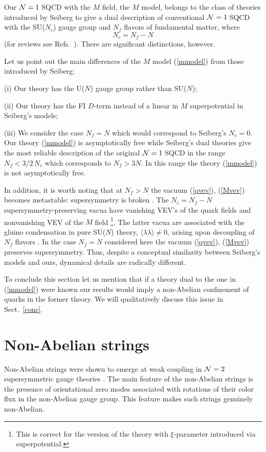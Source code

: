\documentclass[epsfig,12pt]{article}
\newcommand{\ntwo}{${\cal N}=2\;$}
\newcommand{\none}{${\cal N}=1\;$}
\begin{document}
Our \none SQCD with the $M$ field, the $M$ model, belongs to the class of theories
introduced by Seiberg \cite{Sdual} to give a dual description of conventional \none SQCD
with the SU($N_c$) gauge group and $N_f$ flavors of fundamental matter, where
$$N_c=N_f - N$$  (for reviews  see Refs.~\cite{IS,MS}). There are significant distinctions, however.

Let us point out the main 
differences of the $M$ model (\ref{mmodel}) from those introduced \cite{Sdual}
by Seiberg:

(i) Our theory has the U($N$) gauge group rather than SU($N$);

(ii) Our theory has the FI $D$-term instead of a linear in $M$ superpotential
  in Seiberg's models;
  
(iii) We consider the case $N_f=N$ which would correspond to 
Seiberg's $N_c=0$. Our theory
(\ref{mmodel}) is asymptotically free while Seiberg's dual theories 
give the most reliable description of the original \none SQCD in the range
$N_f<3/2\,N_c$ which corresponds to $N_f>3N$. In this range the theory 
(\ref{mmodel}) is not asymptotically free.

In addition, it is worth noting that at $N_f>N$ the vacuum (\ref{qvev}), (\ref{Mvev})
becomes metastable: supersymmetry is broken \cite{ISS}. The $N_c=N_f - N$
supersymmetry-preserving vacua have vanishing VEV's of the quark fields and 
nonvanishing VEV of the $M$ field
\footnote{This is correct for the version of the theory with 
$\xi$-parameter introduced via superpotential.}. The latter vacua are associated with 
the gluino 
condensation in pure SU($N$) theory,
$\langle\lambda\lambda\rangle \neq 0$, arising  upon decoupling of $N_f$ flavors
\cite{IS}. In the case $N_f=N$ considered here the vacuum (\ref{qvev}), 
(\ref{Mvev}) preserves supersymmetry. Thus, despite
a conceptual similarity between Seiberg's models and ours,
dynamical details are radically different. 

To conclude this section let us mention that if a  theory dual to  the one
in (\ref{mmodel}) were known our results would imply a non-Abelian confinement
of quarks in the former theory. We will qualitatively discuss  this issue  
in Sect.~\ref{conc}.

\section{Non-Abelian strings}
\label{strings}
\setcounter{equation}{0}

Non-Abelian strings were shown to emerge at weak coupling
in \ntwo  supersymmetric gauge theories \cite{HT1,ABEKY,SYmon,HT2}.
The  main feature of  the non-Abelian strings is the
presence of orientational zero modes associated with rotations of their
color flux in the non-Abelian gauge group. This feature makes such  strings
genuinely non-Abelian. 
\end{document}
